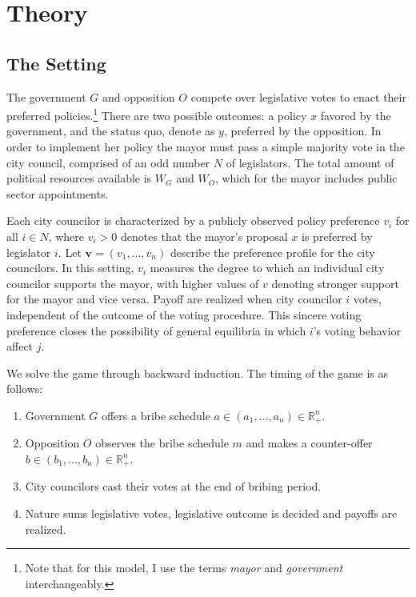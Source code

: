 \documentclass[12pt,a4paper]{article}
\newcommand{\real}{\mathbb{R}_+^n}
\begin{document}
\section{Theory}
\label{sec:theory}

\subsection*{The Setting}

The government $G$ and opposition $O$ compete over legislative votes to enact their preferred policies.\footnote{Note that for this model, I use the terms \emph{mayor} and \emph{government} interchangeably.} There are two possible outcomes: a policy $x$ favored by the government, and the status quo, denote as $y$, preferred by the opposition. In order to implement her policy the mayor must pass a simple majority vote in the city council, comprised of an odd number $N$ of legislators. The total amount of political resources available is $W_G$ and $W_O$, which for the mayor includes public sector appointments.

Each city councilor is characterized by a publicly observed policy preference $v_i$ for all $i \in N$, where $v_i > 0$ denotes that the mayor's proposal $x$ is preferred by legislator $i$. Let $\mathbf{v} = (v_1, ..., v_n)$ describe the preference profile for the city councilors. In this setting, $v_i$ measures the degree to which an individual city councilor supports the mayor, with higher values of $v$ denoting stronger support for the mayor and vice versa. Payoff are realized when city councilor $i$ votes, independent of the outcome of the voting procedure. This sincere voting preference closes the possibility of general equilibria in which $i$'s voting behavior affect $j$.

We solve the game through backward induction. The timing of the game is as follows:

\begin{enumerate}
    \item Government $G$ offers a bribe schedule $a \in (a_1, ..., a_n) \in \real$.
    \item Opposition $O$ observes the bribe schedule $m$ and makes a counter-offer $b \in (b_1, ..., b_n) \in \real$.
    \item City councilors cast their votes at the end of bribing period.
    \item Nature sums legislative votes, legislative outcome is decided and payoffs are realized.
\end{enumerate}
\end{document}
